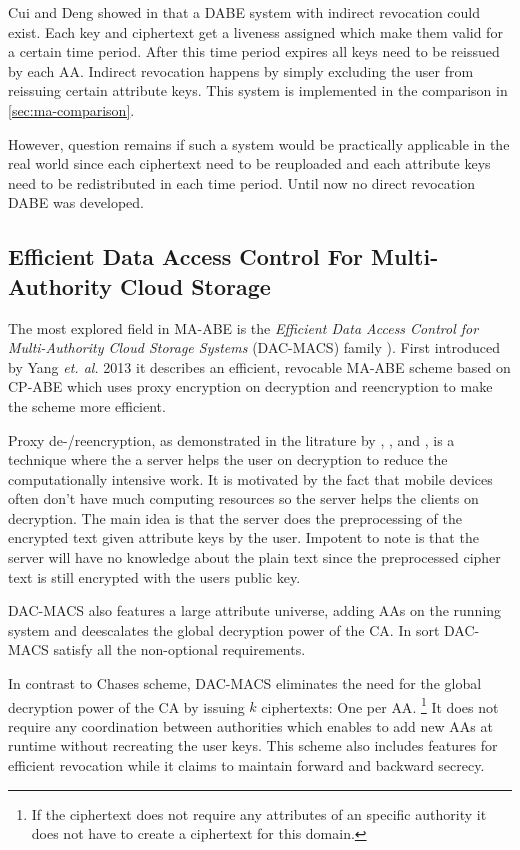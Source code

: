 Cui and Deng showed in \cite{cui2016revocable} that a DABE system with indirect revocation could exist. Each key and ciphertext get a liveness assigned which make them valid for a certain time period. After this time period expires all keys need to be reissued by each \ac{AA}. Indirect revocation happens by simply excluding the user from reissuing certain attribute keys. This system is implemented in the comparison in \ref{sec:ma-comparison}.

However, question remains if such a system would be practically applicable in the real world since each ciphertext need to be reuploaded and each attribute keys need to be redistributed in each time period. Until now no direct revocation DABE was developed.

\subsection{Efficient Data Access Control For Multi-Authority Cloud Storage}
The most explored field in \ac{MA-ABE} is the \textit{Efficient Data Access Control for Multi-Authority Cloud Storage Systems} (\ac{DAC-MACS}) family \cite{yang2013dac}). First introduced by Yang \textit{et. al.} 2013 it describes an efficient, revocable \ac{MA-ABE} scheme based on \ac{CP-ABE} which uses proxy encryption on decryption and reencryption to make the scheme more efficient. 

Proxy de-/reencryption, as demonstrated in the litrature by \cite{yang2013dac}, \cite{wu2017security}, \cite{li2017two} and \cite{wang2011hierarchical}, is a technique where the a server helps the user on decryption to reduce the computationally intensive work. It is motivated by the fact that mobile devices often don't have much computing resources so the server helps the clients on decryption. The main idea is that the server does the preprocessing of the encrypted text given attribute keys by the user. Impotent to note is that the server will have no knowledge about the plain text since the preprocessed cipher text is still encrypted with the users public key.

DAC-MACS also features a large attribute universe, adding \ac{AA}s on the running system and deescalates the global decryption power of the \ac{CA}. In sort \ac{DAC-MACS} satisfy all the non-optional requirements.

In contrast to Chases scheme, DAC-MACS eliminates the need for the global decryption power of the \ac{CA} by issuing $k$ ciphertexts: One per \ac{AA}. \footnote{If the ciphertext does not require any attributes of an specific authority it does not have to create a ciphertext for this domain.} It does not require any coordination between authorities which enables to add new \ac{AA}s at runtime without recreating the user keys. This scheme also includes features for efficient revocation while it claims to maintain forward and backward secrecy.

